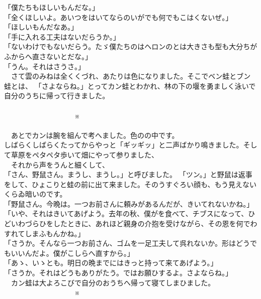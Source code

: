 \documentclass[
a4paper,
book]
{tarticle}
\begin{document}
「僕たちもほしいもんだな。」\\
「全くほしいよ。あいつをはいてならのいがでも何でもこはくないぜ。」\\
「ほしいもんだなあ。」\\
「手に入れる工夫はないだらうか。」\\
「ないわけでもないだらう。たゞ僕たちのはヘロンのとは大きさも型も大分ちがふからへ直さないとだな。」\\
「うん。それはさうさ。」\\
　さて雲のみねは全くくづれ、あたりは色になりました。そこでベン蛙とブン蛙とは、
「さよならね。」とってカン蛙とわかれ、林の下の堰を勇ましく泳いで自分のうちに帰って行きました。\\
\\
　　　　　　　　　　※\\
\\
　あとでカンは腕を組んで考へました。色のの中です。\\
しばらくしばらくたってからやっと「ギッギッ」と二声ばかり鳴きました。そして草原をペタペタ歩いて畑にやって参りました、\\
　それから声をうんと細くして、\\
「さん、野鼠さん。まうし、まうし。」と呼びました。
「ツン。」と野鼠は返事をして、ひょこりと蛙の前に出て来ました。そのうすぐろい顔も、もう見えないくらゐ暗いのです。\\
「野鼠さん。今晩は。一つお前さんに頼みがあるんだが、きいてれないかね。」\\
「いや、それはきいてあげよう。去年の秋、僕がを食べて、チブスになって、ひどいわづらひをしたときに、あれほど親身の介抱を受けながら、その恩を何でわすれてしまふもんかね。」\\
「さうか。そんなら一つお前さん、ゴムを一足工夫して呉れないか。形はどうでもいいんだよ。僕がこしらへ直すから。」\\
「あゝ、いゝとも。明日の晩までにはきっと持って来てあげよう。」\\
「さうか。それはどうもありがたう。ではお願ひするよ。さよならね。」\\
　カン蛙は大よろこびで自分のおうちへ帰って寝てしまひました。\\

　　　　　　　　　　※\\
\end{document}
